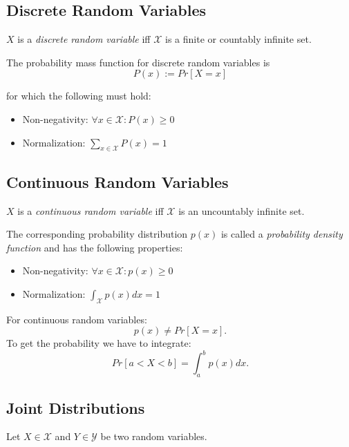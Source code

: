 \subsection{Discrete Random Variables}
\begin{definition}
\(X\) is a \textit{discrete random variable} iff \(\mathcal{X}\) is a finite or countably infinite set.
\end{definition}

\begin{definition}
The probability mass function for discrete random variables is \[
P(x) := Pr[X = x]
\]

for which the following must hold:
\begin{itemize}
\item Non-negativity: \(\forall x \in \mathcal{X}: P(x) \geq 0\)
\item Normalization: \(\sum_{x \in \mathcal{X}} P(x) = 1\)
\end{itemize}
\end{definition}

\subsection{Continuous Random Variables}
\begin{definition}
\(X\) is a \textit{continuous random variable} iff \(\mathcal{X}\) is an uncountably infinite set.
\end{definition}

The corresponding probability distribution \(p(x)\) is called a \textit{probability density function} and has the following properties:
\begin{itemize}
\item Non-negativity: \(\forall x \in \mathcal{X}: p(x) \geq 0\)
\item Normalization: \(\int_\mathcal{X} p(x) dx = 1\)
\end{itemize}

For continuous random variables: \[p(x) \neq Pr[X = x].\] To get the probability we have to integrate: \[
Pr[a < X < b] = \int_a^b p(x) dx.
\]

\subsection{Joint Distributions}
Let \(X \in \mathcal{X}\) and \(Y \in \mathcal{Y}\) be two random variables.


